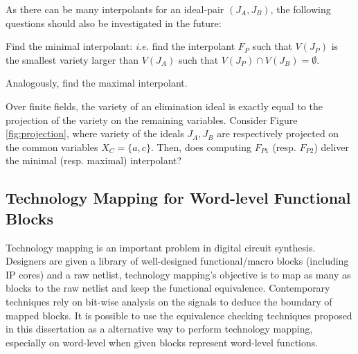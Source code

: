 As there can be many interpolants for an ideal-pair $(J_A, J_B)$, 
the following questions should also be investigated in the future:
\bi
\item Find the minimal interpolant: {\it i.e.} find the interpolant $F_P$
  such that $V(J_P)$ is the smallest variety larger than $V(J_A)$ such
  that $V(J_P) \cap V(J_B) = \emptyset$.
\item Analogously, find the maximal interpolant. 
\item Over finite fields, the variety of an elimination ideal is
  exactly equal to the projection of the variety on the remaining
  variables. Consider Figure \ref{fig:projection}, where variety of the
  ideals $J_A, J_B$ are respectively projected on the common variables
  $X_C = \{a, c\}$. Then, does computing $F_{P1}$ (resp. $F_{P2}$) 
  deliver the minimal (resp. maximal) interpolant?
\ei

\begin{figure}[h]
\end{figure}

% 

\subsection{Technology Mapping for Word-level Functional Blocks}
Technology mapping is an important problem in digital circuit synthesis.
Designers are given a library of well-designed functional/macro blocks (including IP cores) and a raw netlist, 
technology mapping's objective is to map as many as blocks to the raw netlist and 
keep the functional equivalence. Contemporary techniques rely on bit-wise 
analysis on the signals to deduce the boundary of mapped blocks.
It is possible to use the equivalence checking techniques proposed in this dissertation 
as a alternative way to perform technology mapping, especially on word-level when 
given blocks represent word-level functions.

